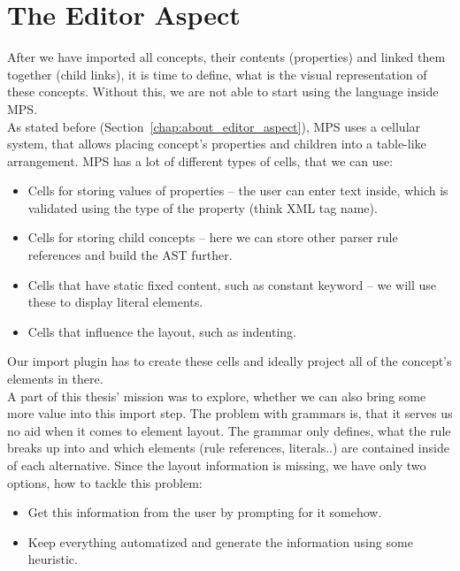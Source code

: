 \section{The Editor Aspect}
\label{chap:editor_aspect}

After we have imported all concepts, their contents (properties) and linked them together (child links), it is time to define, what is the visual representation of these concepts.
Without this, we are not able to start using the language inside MPS.
\\

As stated before (Section~\ref{chap:about_editor_aspect}), MPS uses a cellular system, that allows placing concept's properties and children into a table-like arrangement.
MPS has a lot of different types of cells, that we can use:

\begin{itemize}
	\item Cells for storing values of properties -- the user can enter text inside, which is validated using the type of the property (think XML tag name).

	\item Cells for storing child concepts -- here we can store other parser rule references and build the AST further.

	\item Cells that have static fixed content, such as constant keyword -- we will use these to display literal elements.

	\item Cells that influence the layout, such as indenting.
\end{itemize}

Our import plugin has to create these cells and ideally project all of the concept's elements in there.
\\

A part of this thesis' mission was to explore, whether we can also bring some more value into this import step.
The problem with grammars is, that it serves us no aid when it comes to element layout.
The grammar only defines, what the rule breaks up into and which elements (rule references, literals..) are contained inside of each alternative.
Since the layout information is missing, we have only two options, how to tackle this problem:

\begin{itemize}
	\item Get this information from the user by prompting for it somehow.
	\item Keep everything automatized and generate the information using some heuristic.
\end{itemize}

